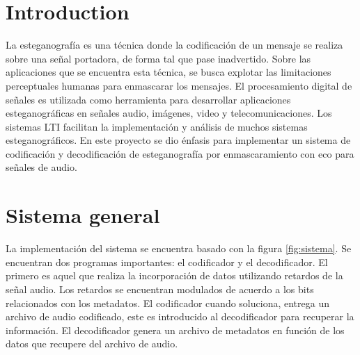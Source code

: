 \documentclass[conference]{IEEEtran}
\begin{document}




%
\IEEEpeerreviewmaketitle



\section{Introduction}
La esteganografía es una técnica donde la codificación de un mensaje se realiza sobre una señal portadora, de forma tal que pase inadvertido. Sobre las aplicaciones que se encuentra esta técnica, se busca explotar las limitaciones perceptuales humanas para enmascarar los mensajes. El procesamiento digital de señales es utilizada como herramienta para desarrollar aplicaciones esteganográficas en señales audio, imágenes, video y telecomunicaciones. Los sistemas LTI facilitan la implementación y análisis de muchos sistemas esteganográficos. En este proyecto se dio énfasis para implementar un sistema de codificación y decodificación de esteganografía por enmascaramiento con eco para señales de audio.

\section{Sistema general}
La implementación del sistema se encuentra basado con la figura \ref{fig:sistema}. Se encuentran dos programas importantes: el codificador y el decodificador. El primero es aquel que realiza la incorporación de datos utilizando retardos de la señal audio. Los retardos se encuentran modulados de acuerdo a los bits relacionados con los metadatos. El codificador cuando soluciona, entrega un archivo de audio codificado, este es introducido al decodificador para recuperar la información. El decodificador genera un archivo de metadatos en función de los datos que recupere del archivo de audio.
\end{document}
